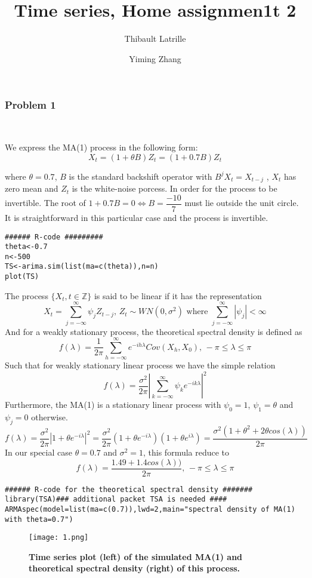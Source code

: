 \documentclass{article}
\author{Thibault Latrille \and Yiming Zhang}
\title{Time series, Home assignmen1t 2}
\begin{document}
\maketitle

\subsubsection*{Problem 1}
\

We express the MA(1) process in the following form:
\[
X_{t}=(1+\theta B)Z_{t}=(1+0.7B)Z_{t}
\]


where $\theta=0.7$, $B$ is the standard backshift operator with $B^{j}X_{t}=X_{t-j}$
, $X_{t}$ has zero mean and $Z_{t}$ is the white-noise porcess.
In order for the process to be invertible. The root of $1+0.7B=0 \iff B=\dfrac{-10}{7}$
must lie outside the unit circle. It is straightforward in this particular case and the process is invertible.
\\

\begin{verbatim}
###### R-code #########
theta<-0.7
n<-500
TS<-arima.sim(list(ma=c(theta)),n=n)
plot(TS)
\end{verbatim}
The process $\{X_t, t \in \mathbb{Z} \}$ is said to be linear if it has the representation  
$$\displaystyle X_t=\sum_{j=-\infty}^{\infty} \psi_j Z_{t-j}\text{, }Z_t \sim WN(0,\sigma^2)\text{ where } \sum_{j=-\infty}^{\infty} |\psi_j|<\infty$$
And for a weakly stationary process, the theoretical spectral density is defined as $$\displaystyle f(\lambda)=\dfrac{1}{2\pi} \sum_{h=-\infty}^{\infty} e^{-ih\lambda} Cov(X_h,X_0)\text{, }-\pi \leq \lambda \leq \pi$$
Such that for weakly stationary linear process we have the simple relation $$\displaystyle f(\lambda)=\dfrac{\sigma^2}{2\pi} \left|\sum_{k=-\infty}^{\infty} \psi_k e^{-ik\lambda}\right|^2$$
Furthermore, the MA(1) is a stationary linear process with $\psi_0=1$, $\psi_1=\theta$ and $\psi_j=0$ otherwise. $$\displaystyle f(\lambda)=\dfrac{\sigma^2}{2\pi} \left|1+\theta e^{-i\lambda}\right|^2=\dfrac{\sigma^2}{2\pi} (1+\theta e^{-i\lambda})(1+\theta e^{i\lambda})=\dfrac{\sigma^2(1+\theta^2+2\theta cos(\lambda))}{2\pi}$$
In our special case $\theta=0.7$ and $\sigma^2=1$, this formula reduce to $$\displaystyle f(\lambda)=\dfrac{1.49+1.4 cos(\lambda))}{2\pi}\text{, }-\pi \leq \lambda \leq \pi$$
\begin{verbatim}
###### R-code for the theoretical spectral density #######
library(TSA)### additional packet TSA is needed ####
ARMAspec(model=list(ma=c(0.7)),lwd=2,main="spectral density of MA(1) with theta=0.7")
\end{verbatim}
\begin{figure}[H]
	\centering
  	\texttt{[image: 1.png]}
  	\caption{\textbf{Time series plot (left) of the simulated MA(1) and theoretical spectral density (right) of this process.} }
\end{figure}
\end{document}
